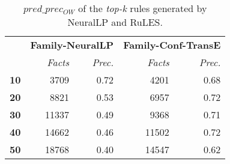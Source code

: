 \begin{table}[t]
\scriptsize
\centering
\begin{tabular}{c|r r|r r}

 \multirow{2}{*}{}&\multicolumn{2}{c}{\textbf{Family-NeuralLP}}&\multicolumn{2}{|c}{\textbf{Family-Conf-TransE}}\\
\textbf{\emph{top-k}}& \textit{Facts} & \textit{Prec.} & \textit{Facts} & \textit{Prec.} \\
 \midrule
\textbf{10} & 3709 & 0.72 & 4201 & 0.68 \\
\textbf{20} & 8821 & 0.53 & 6957 & 0.72 \\
\textbf{30} & 11337 & 0.49 & 9368 & 0.71 \\
\textbf{40} & 14662 & 0.46 & 11502 & 0.72 \\
\textbf{50} & 18768 & 0.40 & 14547 & 0.62 \\
 \bottomrule
\end{tabular}
\caption{$pred\_prec_{OW}$ of the \textit{top-k} rules generated by NeuralLP and RuLES.}
\label{table:neurallp_vs_rules}
\vspace*{-3mm}
\end{table}
